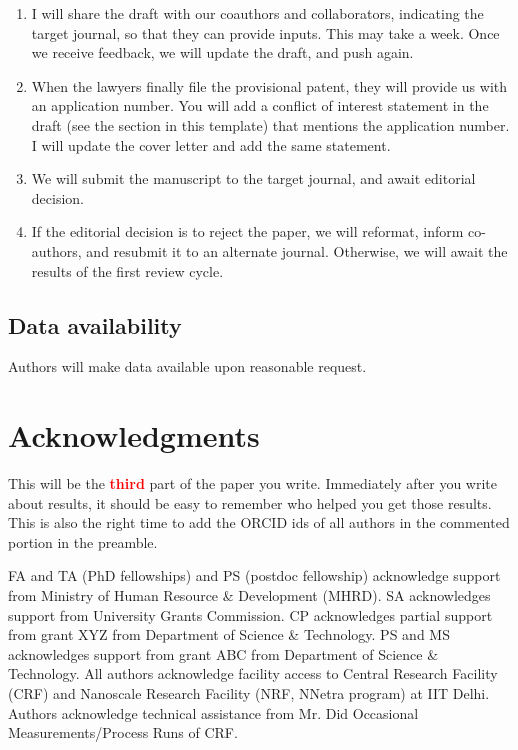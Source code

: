 \documentclass[12 pt]{article}
\begin{document}
\begin{enumerate}
\item I will share the draft with our coauthors and collaborators, indicating the target journal, so that they can provide inputs. This may take a week. Once we receive feedback, we will update the draft, and push again.
\item When the lawyers finally file the provisional patent, they will provide us with an application number. You will add a conflict of interest statement in the draft (see the section in this template) that mentions the application number. I will update the cover letter and add the same statement.
\item We will submit the manuscript to the target journal, and await editorial decision.
\item If the editorial decision is to reject the paper, we will reformat, inform co-authors, and resubmit it to an alternate journal. Otherwise, we will await the results of the first review cycle.
\end{enumerate}

\subsection*{Data availability}

Authors will make data available upon reasonable request.

\section*{Acknowledgments}

This will be the \textbf{\Huge \textcolor{red}{third}} part of the paper you write. Immediately after you write about results, it should be easy to remember who helped you get those results. This is also the right time to add the ORCID ids of all authors in the commented portion in the preamble.

FA and TA (PhD fellowships) and PS (postdoc fellowship) acknowledge support from Ministry of Human Resource \& Development (MHRD). SA acknowledges support from University Grants Commission. CP acknowledges partial support from grant XYZ from Department of Science \& Technology. PS and MS acknowledges support from grant ABC from Department of Science \& Technology. All authors acknowledge facility access to Central Research Facility (CRF) and Nanoscale Research Facility (NRF, NNetra program) at IIT Delhi. Authors acknowledge technical assistance from Mr. Did Occasional Measurements/Process Runs of CRF.
\end{document}
